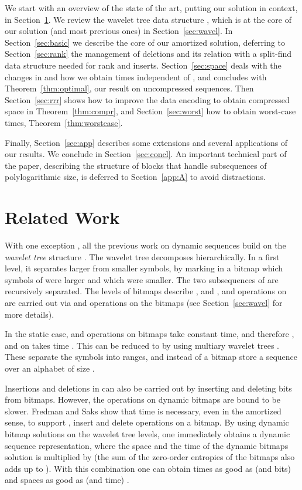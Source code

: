\documentclass[11pt]{article}
\newcommand{\no}[1]{}
\begin{document}
We start with an overview of the state of the art, putting our solution in 
context, in Section~\ref{sec:related}. We review the wavelet tree data 
structure \cite{GGV03}, which is at the core of our solution (and most
previous ones) in Section~\ref{sec:wavel}. In Section~\ref{sec:basic} we 
describe the core of
our amortized solution, deferring to Section~\ref{sec:rank} the management of 
deletions and its relation with a split-find data structure needed for rank
and inserts. Section~\ref{sec:space} deals with the changes in  and
how we obtain times independent of , and concludes
with Theorem~\ref{thm:optimal}, our result on uncompressed sequences.
Then Section~\ref{sec:rrr} shows how to improve the data encoding to obtain
compressed space in Theorem~\ref{thm:compr}, and Section~\ref{sec:worst} 
how to obtain worst-case times, Theorem~\ref{thm:worstcase}.
\no{Finally, Section~\ref{sec:ext} describes some extensions of our results and
Section~\ref{sec:app} describes various applications. }
Finally, Section~\ref{sec:app} describes some extensions and several applications of our results.
We conclude in
Section~\ref{sec:concl}. An important technical part of the paper, describing
the structure of blocks that handle subsequences of polylogarithmic size, is
deferred to Section~\ref{app:A} to avoid distractions.

\section{Related Work}
\label{sec:related}

With one exception \cite{GHSV07}, all the previous work on dynamic sequences
build on the {\em wavelet tree} structure \cite{GGV03}.
The wavelet tree decomposes  hierarchically. In a first level, it separates
larger from smaller symbols, by marking in a bitmap which symbols of  were
larger and which were smaller. The two subsequences of  are recursively
separated. The  levels of bitmaps describe , and , 
and  operations on  are carried out via   and
 operations on the bitmaps (see Section~\ref{sec:wavel} for more details).

In the static case,  and  operations on bitmaps take constant time,
and therefore ,  and  on  takes  time
\cite{GGV03}. This can be reduced to  by using
multiary wavelet trees \cite{FMMN07}. These separate the symbols into
 ranges, and instead of a bitmap store a sequence over an 
alphabet of size . 

Insertions and deletions in  can also be carried out by inserting and 
deleting bits from  bitmaps. However, the operations on dynamic 
bitmaps are bound to be slower. Fredman and Saks \cite{FS89} show that 
 time is necessary, even in the amortized sense, to 
support , insert and delete operations on a bitmap. By using dynamic 
bitmap solutions \cite{HSS03,CHL04,BB04,CHLS07,HSS11} on the wavelet tree
levels, one immediately obtains a dynamic sequence representation, 
where the space and the time of the dynamic bitmaps
solution is multiplied by  (the sum of the zero-order entropies of
the bitmaps also adds up to  \cite{GGV03}). With this combination one
can obtain times as good as  (and  bits) \cite{CHLS07} and spaces as good as  
(and  time) \cite{BB04}.
\end{document}
